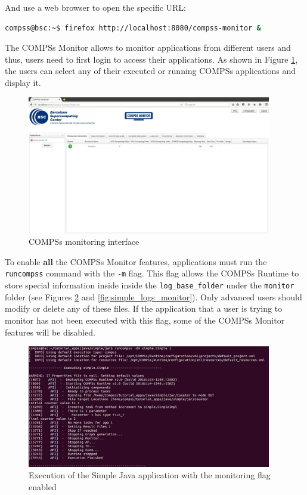 And use a web browser to open the specific URL:
\begin{lstlisting}[language=bash]
compss@bsc:~$ firefox http://localhost:8080/compss-monitor &
\end{lstlisting}

The COMPSs Monitor allows to monitor applications from different users and thus, users need to first login to access their applications. As shown in Figure \ref{fig:monitoring_interface}, the users can select any of their executed or running COMPSs applications and display it.
\begin{figure}[thb!]
  \centering
    \includegraphics[width=0.95\textwidth]{./Sections/4_Tools/Figures/compss_monitor.jpeg}
    \caption{COMPSs monitoring interface}
    \label{fig:monitoring_interface}
\end{figure}

To enable \textbf{all} the COMPSs Monitor features, applications must run the \texttt{runcompss} command with the \texttt{-m} flag. This flag 
allows the  COMPSs Runtime to store special information inside inside the \texttt{log\_base\_folder} under the \texttt{monitor} 
folder (see Figures \ref{fig:simple_exec_monitor} and \ref{fig:simple_logs_monitor}). Only advanced users should modify or delete any of these files. If the application that a user is trying to monitor 
has not been executed with this flag, some of the COMPSs Monitor features will be disabled. 
\begin{figure}[ht!]
  \centering
    \includegraphics[width=0.95\textwidth]{./Sections/4_Tools/Figures/simple_monitor.jpeg}
    \caption{Execution of the Simple Java application with the monitoring flag enabled}
    \label{fig:simple_exec_monitor}
\end{figure}

